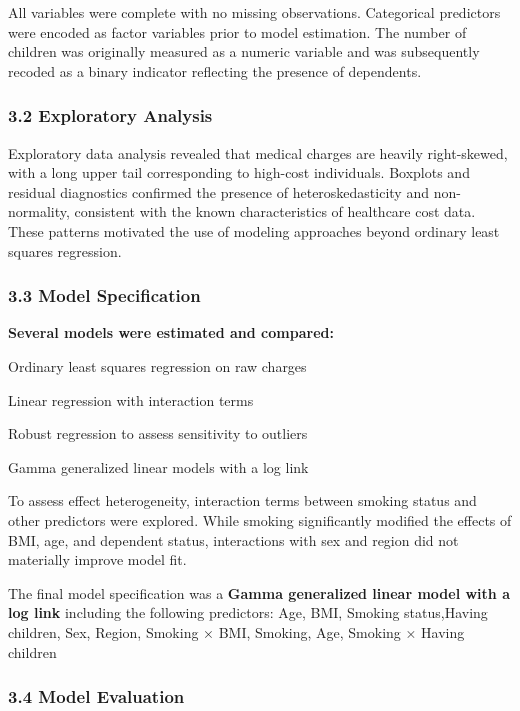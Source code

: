 \documentclass[
  letterpaper,
  DIV=11,
  numbers=noendperiod]{scrartcl}
\begin{document}
All variables were complete with no missing observations. Categorical
predictors were encoded as factor variables prior to model estimation.
The number of children was originally measured as a numeric variable and
was subsequently recoded as a binary indicator reflecting the presence
of dependents.

\subsubsection{\texorpdfstring{\textbf{3.2 Exploratory
Analysis}}{3.2 Exploratory Analysis}}\label{exploratory-analysis}

Exploratory data analysis revealed that medical charges are heavily
right-skewed, with a long upper tail corresponding to high-cost
individuals. Boxplots and residual diagnostics confirmed the presence of
heteroskedasticity and non-normality, consistent with the known
characteristics of healthcare cost data. These patterns motivated the
use of modeling approaches beyond ordinary least squares regression.

\subsubsection{\texorpdfstring{\textbf{3.3 Model
Specification}}{3.3 Model Specification}}\label{model-specification}

\textbf{Several models were estimated and compared:}

Ordinary least squares regression on raw charges

Linear regression with interaction terms

Robust regression to assess sensitivity to outliers

Gamma generalized linear models with a log link

To assess effect heterogeneity, interaction terms between smoking status
and other predictors were explored. While smoking significantly modified
the effects of BMI, age, and dependent status, interactions with sex and
region did not materially improve model fit.

The final model specification was a \textbf{Gamma generalized linear
model with a log link} including the following predictors: Age, BMI,
Smoking status,Having children, Sex, Region, Smoking × BMI, Smoking,
Age, Smoking × Having children

\subsubsection{\texorpdfstring{\textbf{3.4 Model
Evaluation}}{3.4 Model Evaluation}}\label{model-evaluation}
\end{document}
